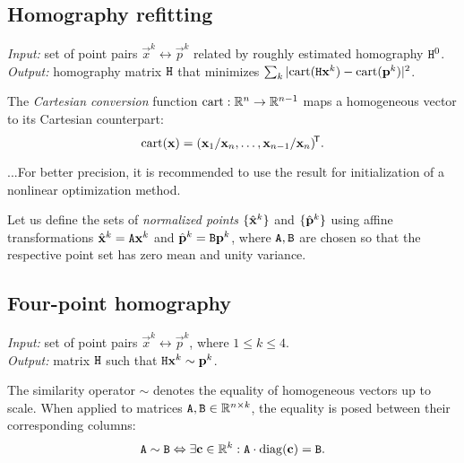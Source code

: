 \subsection{Homography refitting} 

\textit{Input:} set of point pairs $\vec x^k \leftrightarrow \vec p^k$ related by roughly estimated homography $\mathtt{H}^0$.\\
\textit{Output:} homography matrix $\mathtt{H}$ that minimizes $\sum_k |\mathrm{cart}(\mathtt{H} \mathbf{x}^k) - \mathrm{cart}(\mathbf{p}^k)|^2$.\\

\begin{definition}
The \textit{Cartesian conversion} function $\mathrm{cart}: \mathbb{R}^n \to \mathbb{R}^{n - 1}$ maps a homogeneous vector to its Cartesian counterpart:
$$
\mathrm{cart}(\mathbf{x}) = (\mathbf{x}_1 / \mathbf{x}_n, \dots, \mathbf{x}_{n - 1} / \mathbf{x}_n)^{\!\mathsf{T}}.
$$
\end{definition}

...For better precision, it is recommended to use the result for initialization of a nonlinear optimization method.

Let us define the sets of \textit{normalized points} $\{ \hat{\mathbf{x}}^k \}$ and $\{ \hat{\mathbf{p}}^k \}$ using affine transformations $\hat{\mathbf{x}}^k = \mathtt{A} \mathbf{x}^k$ and $\hat{\mathbf{p}}^k = \mathtt{B} \mathbf{p}^k$, where $\mathtt{A}, \mathtt{B}$ are chosen so that the respective point set has zero mean and unity variance.


\subsection{Four-point homography}
\label{s:algo-homo}
\textit{Input:} set of point pairs $\vec x^k \leftrightarrow \vec p^k$, where $1 \leq k \leq 4$.\\
\textit{Output:} matrix $\mathtt{H}$ such that $\mathtt{H} \mathbf{x}^k \sim \mathbf{p}^k$.\\

\begin{definition}
The similarity operator $\sim$ denotes the equality of homogeneous vectors up to scale.
When applied to matrices $\mathtt{A}, \mathtt{B} \in \mathbb{R}^{n \times k}$, the equality is posed between their corresponding columns:
$$
\mathtt{A} \sim \mathtt{B} \Leftrightarrow \exists \mathbf{c} \in \mathbb{R}^k : \mathtt{A} \cdot \mathrm{diag}(\mathbf{c}) = \mathtt{B}.
$$
\end{definition}

